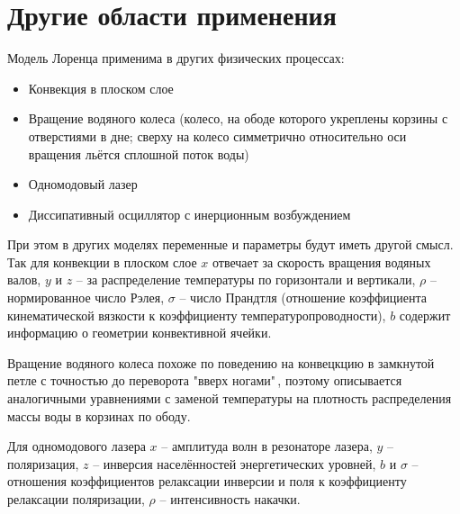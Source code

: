 \documentclass[12pt]{article}
\begin{document}
\section{Другие области применения}

Модель Лоренца применима в других физических процессах:
\begin{itemize}
	\item Конвекция в плоском слое
	\item Вращение водяного колеса (колесо, на ободе которого укреплены корзины с отверстиями в дне; сверху на колесо симметрично относительно оси вращения льётся сплошной поток воды)
	\item Одномодовый лазер
	\item Диссипативный осциллятор с инерционным возбуждением
\end{itemize}

При этом в других моделях переменные и параметры будут иметь другой смысл. Так для конвекции в плоском слое $x$ отвечает за скорость вращения водяных валов, $y$ и $z$ -- за распределение температуры по горизонтали и вертикали, $\rho$ -- нормированное число Рэлея, $\sigma$ -- число Прандтля (отношение коэффициента кинематической вязкости к коэффициенту температуропроводности), $b$ содержит информацию о геометрии конвективной ячейки. 

Вращение водяного колеса похоже по поведению на конвецкцию в замкнутой петле с точностью до переворота "вверх ногами"\,, поэтому описывается аналогичными уравнениями с заменой температуры на плотность распределения массы воды в корзинах по ободу.

Для одномодового лазера $x$ -- амплитуда волн в резонаторе лазера, $y$ -- поляризация, $z$ -- инверсия населённостей энергетических уровней, $b$ и $\sigma$ -- отношения коэффициентов релаксации инверсии и поля к коэффициенту релаксации поляризации, $\rho$ -- интенсивность накачки.
\end{document}
